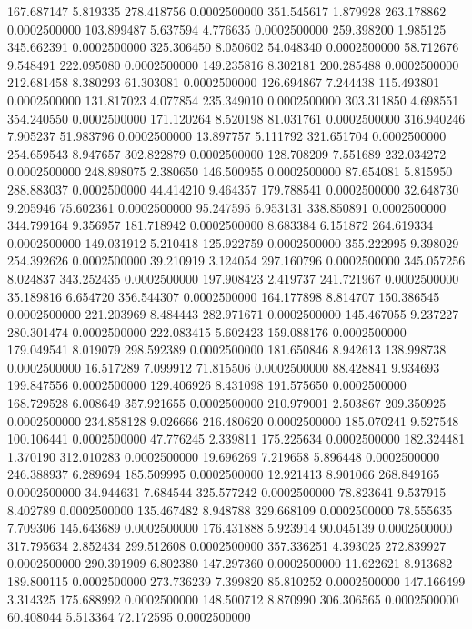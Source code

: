 167.687147 5.819335 278.418756 0.0002500000
351.545617 1.879928 263.178862 0.0002500000
103.899487 5.637594 4.776635 0.0002500000
259.398200 1.985125 345.662391 0.0002500000
325.306450 8.050602 54.048340 0.0002500000
58.712676 9.548491 222.095080 0.0002500000
149.235816 8.302181 200.285488 0.0002500000
212.681458 8.380293 61.303081 0.0002500000
126.694867 7.244438 115.493801 0.0002500000
131.817023 4.077854 235.349010 0.0002500000
303.311850 4.698551 354.240550 0.0002500000
171.120264 8.520198 81.031761 0.0002500000
316.940246 7.905237 51.983796 0.0002500000
13.897757 5.111792 321.651704 0.0002500000
254.659543 8.947657 302.822879 0.0002500000
128.708209 7.551689 232.034272 0.0002500000
248.898075 2.380650 146.500955 0.0002500000
87.654081 5.815950 288.883037 0.0002500000
44.414210 9.464357 179.788541 0.0002500000
32.648730 9.205946 75.602361 0.0002500000
95.247595 6.953131 338.850891 0.0002500000
344.799164 9.356957 181.718942 0.0002500000
8.683384 6.151872 264.619334 0.0002500000
149.031912 5.210418 125.922759 0.0002500000
355.222995 9.398029 254.392626 0.0002500000
39.210919 3.124054 297.160796 0.0002500000
345.057256 8.024837 343.252435 0.0002500000
197.908423 2.419737 241.721967 0.0002500000
35.189816 6.654720 356.544307 0.0002500000
164.177898 8.814707 150.386545 0.0002500000
221.203969 8.484443 282.971671 0.0002500000
145.467055 9.237227 280.301474 0.0002500000
222.083415 5.602423 159.088176 0.0002500000
179.049541 8.019079 298.592389 0.0002500000
181.650846 8.942613 138.998738 0.0002500000
16.517289 7.099912 71.815506 0.0002500000
88.428841 9.934693 199.847556 0.0002500000
129.406926 8.431098 191.575650 0.0002500000
168.729528 6.008649 357.921655 0.0002500000
210.979001 2.503867 209.350925 0.0002500000
234.858128 9.026666 216.480620 0.0002500000
185.070241 9.527548 100.106441 0.0002500000
47.776245 2.339811 175.225634 0.0002500000
182.324481 1.370190 312.010283 0.0002500000
19.696269 7.219658 5.896448 0.0002500000
246.388937 6.289694 185.509995 0.0002500000
12.921413 8.901066 268.849165 0.0002500000
34.944631 7.684544 325.577242 0.0002500000
78.823641 9.537915 8.402789 0.0002500000
135.467482 8.948788 329.668109 0.0002500000
78.555635 7.709306 145.643689 0.0002500000
176.431888 5.923914 90.045139 0.0002500000
317.795634 2.852434 299.512608 0.0002500000
357.336251 4.393025 272.839927 0.0002500000
290.391909 6.802380 147.297360 0.0002500000
11.622621 8.913682 189.800115 0.0002500000
273.736239 7.399820 85.810252 0.0002500000
147.166499 3.314325 175.688992 0.0002500000
148.500712 8.870990 306.306565 0.0002500000
60.408044 5.513364 72.172595 0.0002500000
